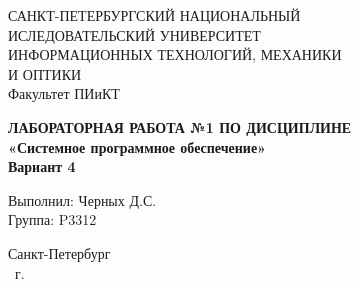 \documentclass[14pt,a4paper,report]{ncc}
\begin{document}
\renewcommand{\thesection}{\arabic{section}}

\renewcommand{\chaptername}{}
\def\contentsname{Содержание}

\begin{titlepage}
\begin{center}
\large{САНКТ-ПЕТЕРБУРГСКИЙ НАЦИОНАЛЬНЫЙ\\
ИСЛЕДОВАТЕЛЬСКИЙ УНИВЕРСИТЕТ\\
ИНФОРМАЦИОННЫХ ТЕХНОЛОГИЙ, МЕХАНИКИ\\
И ОПТИКИ\\[5mm]
Факультет ПИиКТ\\[2mm]}

\vfill

\textbf{ЛАБОРАТОРНАЯ РАБОТА №1 ПО ДИСЦИПЛИНЕ\\[3mm]
«Системное программное обеспечение»\\[6mm]
Вариант 4
\\[20mm]
}
\end{center}

\hfill
\begin{minipage}{.5\textwidth}
Выполнил: Черных Д.С.\\
Группа: P3312\\[5mm]
\end{minipage}%
\vfill
\begin{center}
 Санкт-Петербург\\\theyear\ г.
\end{center}
\end{titlepage}
\thispagestyle{empty}
\tableofcontents
\thispagestyle{empty}
\newpage










\end{document}
